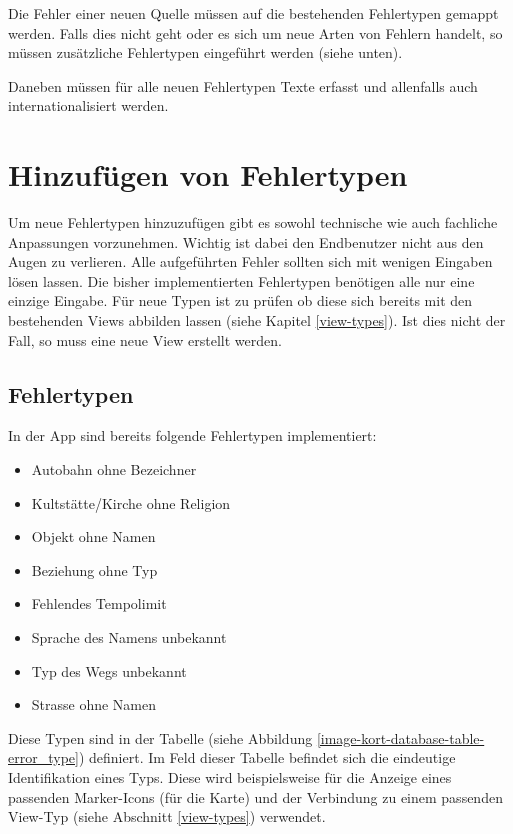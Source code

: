 Die Fehler einer neuen Quelle müssen auf die bestehenden Fehlertypen gemappt werden.
Falls dies nicht geht oder es sich um neue Arten von Fehlern handelt, so müssen zusätzliche Fehlertypen eingeführt werden (siehe unten).

Daneben müssen für alle neuen Fehlertypen Texte erfasst und allenfalls auch internationalisiert werden. 

\section{Hinzufügen von Fehlertypen}
\label{additional-error-type}
Um neue Fehlertypen hinzuzufügen gibt es sowohl technische wie auch fachliche Anpassungen vorzunehmen.
Wichtig ist dabei den Endbenutzer nicht aus den Augen zu verlieren.
Alle aufgeführten Fehler sollten sich mit wenigen Eingaben lösen lassen.
Die bisher implementierten Fehlertypen benötigen alle nur eine einzige Eingabe.
Für neue Typen ist zu prüfen ob diese sich bereits mit den bestehenden Views abbilden lassen (siehe Kapitel \ref{view-types}).
Ist dies nicht der Fall, so muss eine neue View erstellt werden.

\subsection{Fehlertypen}
In der App sind bereits folgende Fehlertypen implementiert:

\begin{itemize}
\item Autobahn ohne Bezeichner
\item Kultstätte/Kirche ohne Religion
\item Objekt ohne Namen
\item Beziehung ohne Typ
\item Fehlendes Tempolimit
\item Sprache des Namens unbekannt
\item Typ des Wegs unbekannt
\item Strasse ohne Namen
\end{itemize}

Diese Typen sind in der Tabelle  (siehe Abbildung \ref{image-kort-database-table-error_type}) definiert.
Im Feld  dieser Tabelle befindet sich die eindeutige Identifikation eines Typs.
Diese wird beispielsweise für die Anzeige eines passenden Marker-Icons (für die Karte) und der Verbindung zu einem passenden View-Typ (siehe Abschnitt \ref{view-types}) verwendet.

